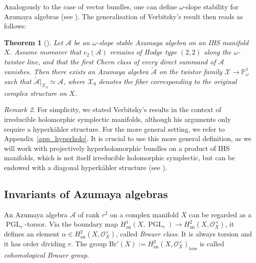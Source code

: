 \documentclass[12pt,a4paper]{amsart}
\theoremstyle{plain}
\newtheorem{thm}{Theorem}[section]
\theoremstyle{definition}
\theoremstyle{remark}
\newtheorem{rmk}[thm]{Remark}
\def\H{H}
\def\PGL{\operatorname{PGL}}
\newcommand{\Br}{\mathrm{Br}}
\newcommand{\cc}{c}
\begin{document}
Analogously to the case of vector bundles, one can define $\omega$-slope stability for Azumaya algebras (see \cite[Definition~6.5]{markman_bbf}). The generalisation of Verbitsky's result then reads as follows:
\begin{thm}[{\cite[Corollary~6.12]{markman_bbf}}]\label{deformingazumaya}
Let $\mathcal{A}$ be an $\omega$-slope stable Azumaya algebra on an IHS manifold $X$. Assume moreover that $\cc_2(\mathcal{A})$ remains of Hodge type $(2,2)$ along the $\omega$-twistor line, and that the first Chern class of every direct summand of $\mathcal{A}$ vanishes. Then there exists an Azumaya algebra $\widetilde{\mathcal{A}}$ on the twistor family $\mathcal{X} \rightarrow \mathbb{P}^1_\omega$ such that $\widetilde{\mathcal{A}}|_{\mathcal{X}_0} \simeq \mathcal{A}$, where $\mathcal{X}_0$ denotes the fiber corresponding to the original complex structure on $X$.\end{thm}



\begin{rmk}
For simplicity, we stated Verbitsky's results in the context of irreducible holomorphic symplectic manifolds, although his arguments only require a hyperk\"ahler structure. For the more general setting, we refer to Appendix~\ref{app_hyperholo}. It is crucial to use this more general definition, as we will work with projectively hyperholomorphic bundles on a product of IHS manifolds, which is not itself irreducible holomorphic symplectic, but can be endowed with a diagonal hyperk\"ahler structure (see \cite[Section 5.3]{markman}).
\end{rmk}


\subsection{Invariants of Azumaya algebras} An Azumaya algebra $\mathcal{A}$ of rank $r^2$ on a complex manifold $X$ can be regarded as a $\PGL_r$-torsor. Via the boundary map $\H^1_{\mathrm{an}}(X,\PGL_r)\rightarrow \H^2_{\mathrm{an}}(X,\mathcal{O}^\times_X)$, it defines an element $\alpha\in \H^2_{\mathrm{an}}(X,\mathcal{O}^\times_X)$, called \emph{Brauer class}. It is always torsion and it has order dividing $r$. The group $\Br'(X):=\H^2_{\mathrm{an}}(X,\mathcal{O}^\times_X)_\mathrm{tors}$ is called \emph{cohomological Brauer group}.
\end{document}
